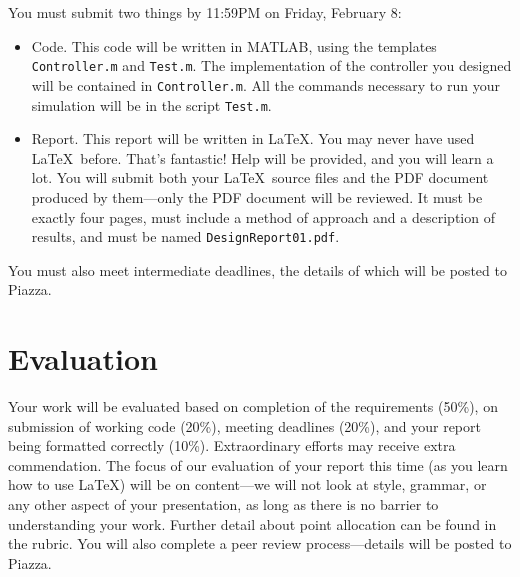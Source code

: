 \documentclass[12pt]{article}
\begin{document}
You must submit two things by 11:59PM on Friday, February 8:
\begin{itemize}

\item Code. This code will be written in MATLAB, using the templates \lstinline!Controller.m! and \lstinline!Test.m!. The implementation of the controller you designed will be contained in \lstinline|Controller.m|. All the commands necessary to run your simulation will be in the script \lstinline|Test.m|.

\item Report. This report will be written in \LaTeX. You may never have used \LaTeX\ before. That's fantastic! Help will be provided, and you will learn a lot. You will submit both your \LaTeX\ source files and the PDF document produced by them---only the PDF document will be reviewed. It must be exactly four pages, must include a method of approach and a description of results, and must be named \lstinline|DesignReport01.pdf|.

\end{itemize}
You must also meet intermediate deadlines, the details of which will be posted to Piazza.

\section{Evaluation}

Your work will be evaluated based on completion of the requirements (50\%), on submission of working code (20\%), meeting deadlines (20\%), and your report being formatted correctly (10\%). Extraordinary efforts may receive extra commendation. The focus of our evaluation of your report this time (as you learn how to use \LaTeX) will be on content---we will not look at style, grammar, or any other aspect of your presentation, as long as there is no barrier to understanding your work. Further detail about point allocation can be found in the rubric. You will also complete a peer review process---details will be posted to Piazza.


\end{document}
